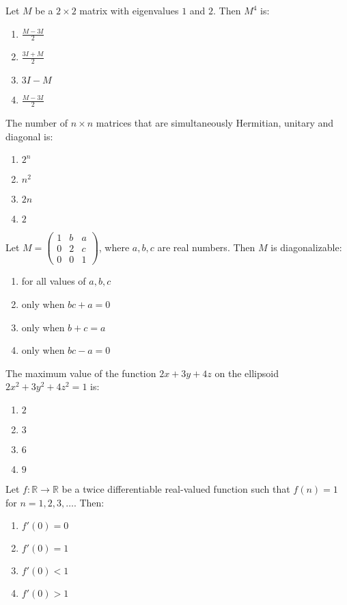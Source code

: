 \item Let $M$ be a $2 \times 2$ matrix with eigenvalues $1$ and $2$. Then $M^4$ is:
\begin{enumerate}
    \item $\frac{M - 3I}{2}$
    \item $\frac{3I + M}{2}$
    \item $3I - M$
    \item $\frac{M - 3I}{2}$
\end{enumerate}
\item The number of $n \times n$ matrices that are simultaneously Hermitian, unitary and diagonal is:
\begin{enumerate}
    \item $2^n$
    \item $n^2$
    \item $2n$
    \item $2$
\end{enumerate}

\item Let $M = \begin{pmatrix} 1 & b & a \\ 0 & 2 & c \\ 0 & 0 & 1 \end{pmatrix}$, where $a, b, c$ are real numbers. Then $M$ is diagonalizable:
\begin{enumerate}
    \item for all values of $a, b, c$
    \item only when $bc + a = 0$
    \item only when $b + c = a$
    \item only when $bc - a = 0$
\end{enumerate}

\item The maximum value of the function $2x + 3y + 4z$ on the ellipsoid $2x^2 + 3y^2 + 4z^2 = 1$ is:
\begin{enumerate}
    \item $2$
    \item $3$
    \item $6$
    \item $9$
\end{enumerate}

\item Let $f: \mathbb{R} \to \mathbb{R}$ be a twice differentiable real-valued function such that $f(n) = 1$ for $n = 1, 2, 3, \dots$. Then:
\begin{enumerate}
    \item $f'(0) = 0$
    \item $f'(0) = 1$
    \item $f'(0) < 1$
    \item $f'(0) > 1$
\end{enumerate}

